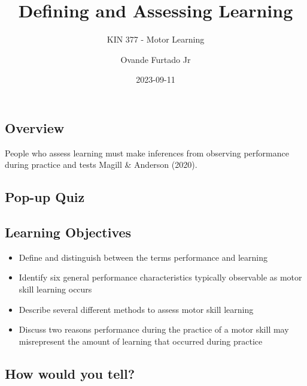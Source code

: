 \documentclass[
  letterpaper,
  DIV=11,
  numbers=noendperiod]{scrartcl}
\title{Defining and Assessing Learning}
\subtitle{KIN 377 - Motor Learning}
\author{Ovande Furtado Jr}
\date{2023-09-11}
\providecommand{\tightlist}{%
  \setlength{\itemsep}{0pt}\setlength{\parskip}{0pt}}\usepackage{longtable,booktabs,array}
\begin{document}
\maketitle
\ifdefined\Shaded\renewenvironment{Shaded}{\begin{tcolorbox}[frame hidden, breakable, interior hidden, enhanced, boxrule=0pt, sharp corners, borderline west={3pt}{0pt}{shadecolor}]}{\end{tcolorbox}}\fi

\hypertarget{overview}{%
\subsection{Overview}\label{overview}}

People who assess learning must make inferences from observing
performance during practice and tests\hspace{0pt} Magill \& Anderson
(2020).

\hypertarget{pop-up-quiz}{%
\subsection{Pop-up Quiz}\label{pop-up-quiz}}

\hypertarget{learning-objectives}{%
\subsection{Learning Objectives}\label{learning-objectives}}

\begin{itemize}
\tightlist
\item
  Define and distinguish between the terms performance and
  learning\hspace{0pt}
\item
  Identify six general performance characteristics typically observable
  as motor skill learning occurs\hspace{0pt}
\item
  Describe several different methods to assess motor skill
  learning\hspace{0pt}
\item
  Discuss two reasons performance during the practice of a motor skill
  may misrepresent the amount of learning that occurred during
  practice\hspace{0pt}
\end{itemize}

\hypertarget{how-would-you-tell}{%
\subsection{How would you tell?}\label{how-would-you-tell}}
\end{document}
